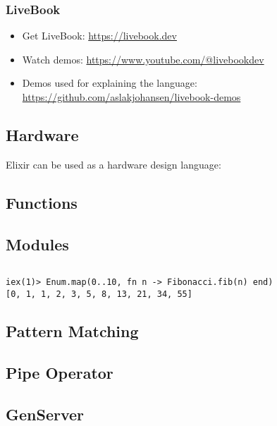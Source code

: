 {\subsubsection{LiveBook}

\begin{itemize}
  \item Get LiveBook: \url{https://livebook.dev}
  \item Watch demos: \url{https://www.youtube.com/@livebookdev}
  \item Demos used for explaining the language: \url{https://github.com/aslakjohansen/livebook-demos}
\end{itemize}

\subsection{Hardware}

Elixir can be used as a hardware design language: \\

\subsection{Functions}

\subsection{Modules}

\inputminted[fontsize=\normalsize]{elixir}{../src/elixir/fibonacci.ex}

\begin{verbatim}
iex(1)> Enum.map(0..10, fn n -> Fibonacci.fib(n) end)
[0, 1, 1, 2, 3, 5, 8, 13, 21, 34, 55]
\end{verbatim}

\subsection{Pattern Matching}

\subsection{Pipe Operator}

\subsection{GenServer}

}

